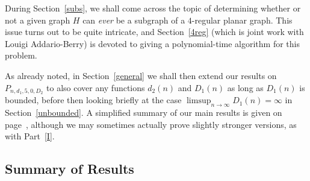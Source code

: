 \documentclass{article}
\newtheorem{Proof of Theorem}{Proof of Theorem}
\begin{document}
During Section~\ref{subs},
we shall come across the topic of determining whether or not a given graph $H$ 
can \textit{ever} be a subgraph of a $4$-regular planar graph.
This issue turns out to be quite intricate,
and Section~\ref{4reg} (which is joint work with Louigi Addario-Berry) 
is devoted to giving a polynomial-time algorithm for this problem.

As already noted, in Section~\ref{general}
we shall then extend our results on $P_{n,d_{1},5,0,D_{2}}$ 
to also cover any functions $d_{2}(n)$ and $D_{1}(n)$ as long as $D_{1}(n)$ is bounded,
before then looking briefly at the case $\limsup_{n \to \infty} D_{1}(n) = \infty$ in Section~\ref{unbounded}.
A simplified summary of our main results 
is given on page~\pageref{sum},
although we may sometimes actually prove slightly stronger versions, as with Part~\ref{I}.















\newpage
\subsection*{Summary of Results} \label{sum}
\end{document}
